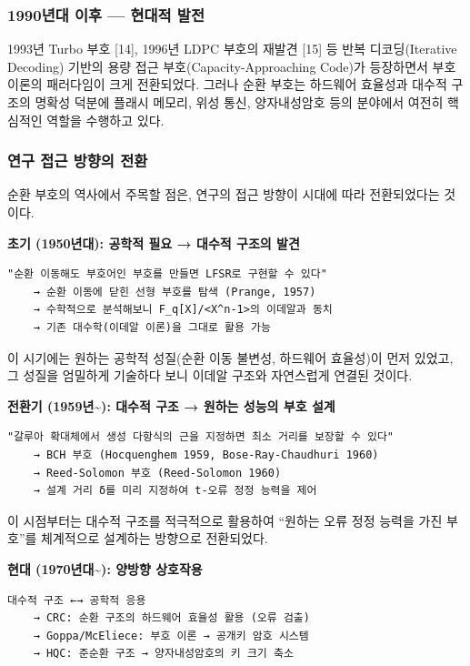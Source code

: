 \documentclass[
  oneside]{article}
\begin{document}
\subsubsection{1990년대 이후 --- 현대적
발전}\label{uxb144uxb300-uxc774uxd6c4-uxd604uxb300uxc801-uxbc1cuxc804}

1993년 Turbo 부호 {[}14{]}, 1996년 LDPC 부호의 재발견 {[}15{]} 등 반복
디코딩(Iterative Decoding) 기반의 용량 접근 부호(Capacity-Approaching
Code)가 등장하면서 부호 이론의 패러다임이 크게 전환되었다. 그러나 순환
부호는 하드웨어 효율성과 대수적 구조의 명확성 덕분에 플래시 메모리, 위성
통신, 양자내성암호 등의 분야에서 여전히 핵심적인 역할을 수행하고 있다.

\subsubsection{연구 접근 방향의
전환}\label{uxc5f0uxad6c-uxc811uxadfc-uxbc29uxd5a5uxc758-uxc804uxd658}

순환 부호의 역사에서 주목할 점은, 연구의 접근 방향이 시대에 따라
전환되었다는 것이다.

\textbf{초기 (1950년대): 공학적 필요 → 대수적 구조의 발견}

\begin{verbatim}
"순환 이동해도 부호어인 부호를 만들면 LFSR로 구현할 수 있다"
    → 순환 이동에 닫힌 선형 부호를 탐색 (Prange, 1957)
    → 수학적으로 분석해보니 F_q[X]/<X^n-1>의 이데알과 동치
    → 기존 대수학(이데알 이론)을 그대로 활용 가능
\end{verbatim}

이 시기에는 원하는 공학적 성질(순환 이동 불변성, 하드웨어 효율성)이 먼저
있었고, 그 성질을 엄밀하게 기술하다 보니 이데알 구조와 자연스럽게 연결된
것이다.

\textbf{전환기 (1959년\textasciitilde): 대수적 구조 → 원하는 성능의 부호
설계}

\begin{verbatim}
"갈루아 확대체에서 생성 다항식의 근을 지정하면 최소 거리를 보장할 수 있다"
    → BCH 부호 (Hocquenghem 1959, Bose-Ray-Chaudhuri 1960)
    → Reed-Solomon 부호 (Reed-Solomon 1960)
    → 설계 거리 δ를 미리 지정하여 t-오류 정정 능력을 제어
\end{verbatim}

이 시점부터는 대수적 구조를 적극적으로 활용하여 ``원하는 오류 정정
능력을 가진 부호''를 체계적으로 설계하는 방향으로 전환되었다.

\textbf{현대 (1970년대\textasciitilde): 양방향 상호작용}

\begin{verbatim}
대수적 구조 ←→ 공학적 응용
    → CRC: 순환 구조의 하드웨어 효율성 활용 (오류 검출)
    → Goppa/McEliece: 부호 이론 → 공개키 암호 시스템
    → HQC: 준순환 구조 → 양자내성암호의 키 크기 축소
\end{verbatim}
\end{document}
